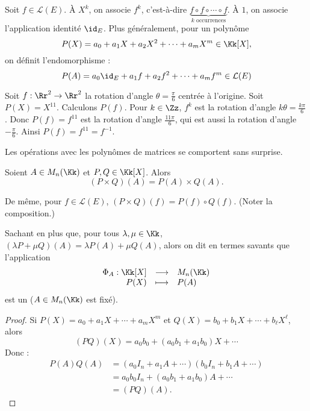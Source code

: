 \documentclass[12pt, class=report,crop=false]{standalone}
\begin{document}
\bigskip


Soit $f \in \mathcal{L}(E)$.
\`A $X^k$, on associe $f^k$, c'est-à-dire $\underbrace{f\circ f \circ \cdots \circ f}_{k \text{ occurrences}}$. \`A $1$, on associe l'application identité $\id_E$.
Plus généralement, pour un polynôme
\[P(X) = a_0 + a_1 X +a_2 X^2 + \cdots  + a_m X^m \in\Kk[X],\]
on définit l'endomorphisme :
\[P(A) = a_0 \id_E +a_1 f +a_2 f^2 +  \cdots +a_m f^m \in \mathcal{L}(E) \] 

 
\begin{exemple}
Soit $f : \Rr^2 \to \Rr^2$ la rotation d'angle $\theta = \frac{\pi}{6}$ centrée à l'origine.
Soit $P(X) = X^{11}$. Calculons $P(f)$.
Pour $k \in \Zz$, $f^k$ est la rotation d'angle $k\theta = \frac{k\pi}{6}$.
Donc $P(f) = f^{11}$ est la rotation d'angle $\frac{11\pi}{6}$, qui est aussi la rotation d'angle
$-\frac{\pi}{6}$. Ainsi $P(f) = f^{11} = f^{-1}$.
\end{exemple}


Les opérations avec les polynômes de matrices se comportent sans surprise.
\begin{proposition}
Soient $A \in M_n(\Kk)$ et $P,Q \in \Kk[X]$. Alors  
\[(P \times Q)(A) = P(A) \times Q(A).\]
\end{proposition}

De même, pour $f \in \mathcal{L}(E)$, $(P \times Q)(f) = P(f) \circ Q(f)$. (Noter la composition.)

Sachant en plus que, pour tous $\lambda,\mu\in\Kk$, $(\lambda P + \mu Q)(A) = \lambda P(A) +\mu Q(A)$, alors on dit en termes savants que l'application 
\[\begin{array}{rcl}
\Phi_A : \Kk[X] & \longrightarrow & M_n(\Kk) \\
P(X) & \longmapsto & P(A)
\end{array}
\]
est un  ($A \in M_n(\Kk)$ est fixé).

\begin{proof}
Si $P(X) = a_0 + a_1X + \cdots + a_mX^m$ et $Q(X) = b_0 + b_1X + \cdots + b_\ell X^\ell$, 
alors 
$$(PQ)(X) = a_0b_0 +(a_0 b_1 + a_1b_0) X + \cdots$$ 
Donc :
\begin{align*}
P(A) Q(A)
  &= (a_0 I_n + a_1 A + \cdots)(b_0 I_n +b_1 A + \cdots) \\
  &= a_0b_0 I_n + (a_0b_1 + a_1b_0) A + \cdots \\  
  &= (PQ)(A) .
\end{align*}
\end{proof}
\end{document}
